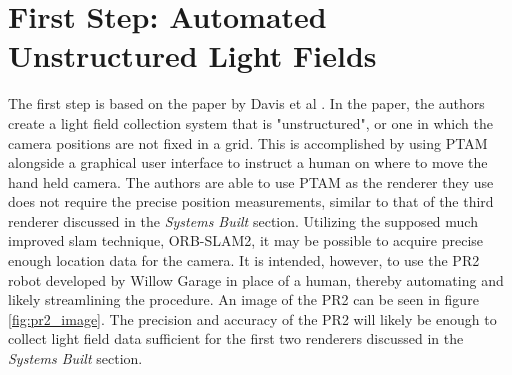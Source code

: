 \documentclass[12pt]{report}
\begin{document}
\section{First Step: Automated Unstructured Light Fields}
The first step is based on the paper by Davis et al \cite{Davis12}. In the paper, the authors create a light field collection system that is "unstructured", or one in which the camera positions are not fixed in a grid. This is accomplished by using PTAM alongside a graphical user interface to instruct a human on where to move the hand held camera. The authors are able to use PTAM as the renderer they use does not require the precise position measurements, similar to that of the third renderer discussed in the \emph{Systems Built} section. Utilizing the supposed much improved slam technique, ORB-SLAM2, it may be possible to acquire precise enough location data for the camera. It is intended, however, to use the PR2 robot developed by Willow Garage in place of a human, thereby automating and likely streamlining the procedure. An image of the PR2 can be seen in figure \ref{fig:pr2_image}. The precision and accuracy of the PR2 will likely be enough to collect light field data sufficient for the first two renderers discussed in the \emph{Systems Built} section.
\end{document}
